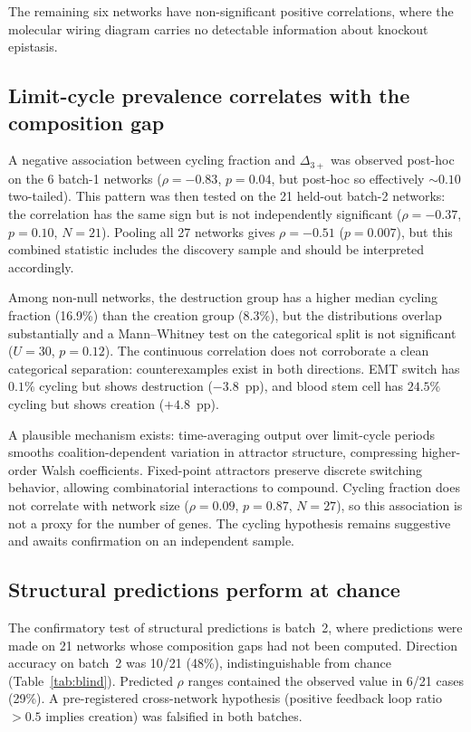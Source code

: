 \documentclass[10pt,letterpaper]{article}
\begin{document}
The remaining six networks have non-significant positive
correlations, where the molecular wiring diagram carries no detectable
information about knockout epistasis.


\subsection*{Limit-cycle prevalence correlates with the composition gap}
\label{sec:cycling}

A negative association between cycling fraction and $\Delta_{3+}$ was
observed post-hoc on the 6 batch-1 networks ($\rho = -0.83$,
$p = 0.04$, but post-hoc so effectively $\sim 0.10$ two-tailed).
This pattern was then tested on the 21 held-out batch-2 networks:
the correlation has the same sign but is not independently
significant ($\rho = -0.37$, $p = 0.10$, $N = 21$). Pooling all 27
networks gives $\rho = -0.51$ ($p = 0.007$), but this combined
statistic includes the discovery sample and should be interpreted
accordingly.

Among non-null networks, the destruction group has a higher median
cycling fraction (16.9\%) than the creation group (8.3\%), but the
distributions overlap substantially and a Mann--Whitney test on the
categorical split is not significant ($U = 30$, $p = 0.12$). The
continuous correlation does not corroborate a clean categorical
separation: counterexamples exist in both directions. EMT switch has
$0.1\%$ cycling but shows destruction ($-3.8$~pp), and blood stem
cell has $24.5\%$ cycling but shows creation ($+4.8$~pp).

A plausible mechanism exists: time-averaging output over limit-cycle
periods smooths coalition-dependent variation in attractor structure,
compressing higher-order Walsh coefficients. Fixed-point attractors
preserve discrete switching behavior, allowing combinatorial
interactions to compound. Cycling fraction does not correlate with
network size ($\rho = 0.09$, $p = 0.87$, $N = 27$), so this
association is not a proxy for the number of genes. The cycling
hypothesis remains suggestive and awaits confirmation on an
independent sample.


\subsection*{Structural predictions perform at chance}
\label{sec:blind-results}

The confirmatory test of structural predictions is batch~2, where
predictions were made on 21 networks whose composition gaps had not
been computed. Direction accuracy on batch~2 was 10/21 (48\%),
indistinguishable from chance (Table~\ref{tab:blind}). Predicted
$\rho$ ranges contained the observed value in 6/21 cases (29\%). A
pre-registered cross-network hypothesis (positive feedback loop ratio
$> 0.5$ implies creation) was falsified in both batches.
\end{document}
